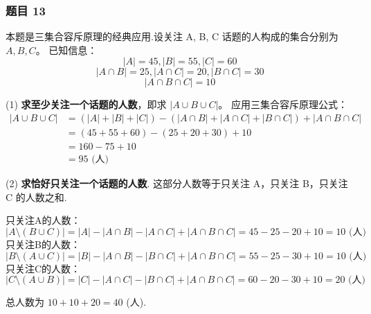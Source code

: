 \subsubsection*{题目 13}
\begin{solution}
	本题是三集合容斥原理的经典应用.设关注 A, B, C 话题的人构成的集合分别为 $A, B, C$。
	已知信息：
	\[ |A|=45, |B|=55, |C|=60 \]
	\[ |A \cap B|=25, |A \cap C|=20, |B \cap C|=30 \]
	\[ |A \cap B \cap C|=10 \]
	
	(1) \textbf{求至少关注一个话题的人数}，即求 $|A \cup B \cup C|$。
	应用三集合容斥原理公式：
	\begin{align*}
		|A \cup B \cup C| &= (|A|+|B|+|C|) - (|A \cap B|+|A \cap C|+|B \cap C|) + |A \cap B \cap C| \\
		&= (45+55+60) - (25+20+30) + 10 \\
		&= 160 - 75 + 10 \\
		&= 95 \text{ (人)}
	\end{align*}
	
	(2) \textbf{求恰好只关注一个话题的人数}.
	这部分人数等于只关注 A，只关注 B，只关注 C 的人数之和.
	
	只关注A的人数：
	\[ |A \setminus (B \cup C)| = |A| - |A \cap B| - |A \cap C| + |A \cap B \cap C| = 45 - 25 - 20 + 10 = 10 \text{ (人)} \]
	只关注B的人数：
	\[ |B \setminus (A \cup C)| = |B| - |A \cap B| - |B \cap C| + |A \cap B \cap C| = 55 - 25 - 30 + 10 = 10 \text{ (人)} \]
	只关注C的人数：
	\[ |C \setminus (A \cup B)| = |C| - |A \cap C| - |B \cap C| + |A \cap B \cap C| = 60 - 20 - 30 + 10 = 20 \text{ (人)} \]
	
	总人数为 $10 + 10 + 20 = 40$ (人).
\end{solution}

